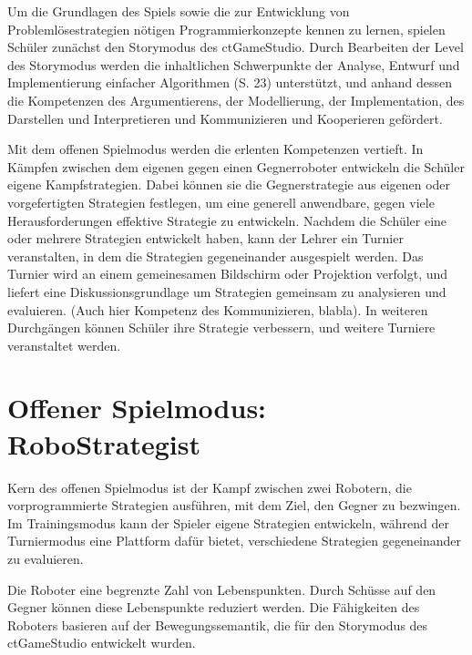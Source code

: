 Um die Grundlagen des Spiels sowie die zur Entwicklung von Problemlösestrategien nötigen
Programmierkonzepte kennen zu lernen, spielen Schüler zunächst den Storymodus des ctGameStudio.
Durch Bearbeiten der Level des Storymodus werden die inhaltlichen Schwerpunkte der Analyse, Entwurf
und Implementierung einfacher Algorithmen (S. 23) unterstützt, und anhand dessen die Kompetenzen des
Argumentierens, der Modellierung, der Implementation, des Darstellen und Interpretieren und
Kommunizieren und Kooperieren gefördert.

Mit dem offenen Spielmodus werden die erlenten Kompetenzen vertieft. In Kämpfen zwischen dem eigenen
gegen einen Gegnerroboter entwickeln die Schüler eigene Kampfstrategien. Dabei können sie die
Gegnerstrategie aus eigenen oder vorgefertigten Strategien festlegen, um eine generell anwendbare,
gegen viele Herausforderungen effektive Strategie zu entwickeln. Nachdem die Schüler eine oder
mehrere Strategien entwickelt haben, kann der Lehrer ein Turnier veranstalten, in dem die Strategien
gegeneinander ausgespielt werden. Das Turnier wird an einem gemeinesamen Bildschirm oder Projektion
verfolgt, und liefert eine Diskussionsgrundlage um Strategien gemeinsam zu analysieren und
evaluieren. (Auch hier Kompetenz des Kommunizieren, blabla). In weiteren Durchgängen können Schüler
ihre Strategie verbessern, und weitere Turniere veranstaltet werden.


\section{Offener Spielmodus: RoboStrategist}

Kern des offenen Spielmodus ist der Kampf zwischen zwei Robotern, die vorprogrammierte Strategien
ausführen, mit dem Ziel, den Gegner zu bezwingen. Im Trainingsmodus kann der Spieler eigene
Strategien entwickeln, während der Turniermodus eine Plattform dafür bietet, verschiedene Strategien
gegeneinander zu evaluieren.

Die Roboter eine begrenzte Zahl von Lebenspunkten. Durch Schüsse auf den Gegner können diese
Lebenspunkte reduziert werden. Die Fähigkeiten des Roboters basieren auf der Bewegungssemantik, die
für den Storymodus des ctGameStudio entwickelt wurden.


